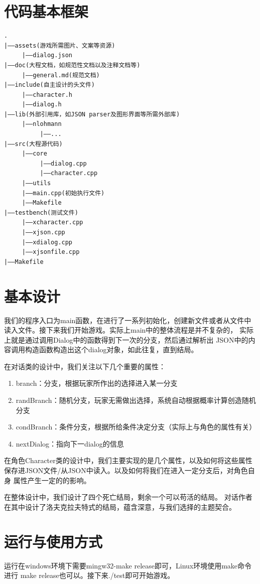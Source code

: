 \documentclass[UTF8]{ctexart}
\begin{document}
    \section{代码基本框架}
\begin{lstlisting}
.
|——assets(游戏所需图片、文案等资源)
     |——dialog.json
|——doc(大程文档，如规范性文档以及注释文档等)
     |——general.md(规范文档)
|——include(自主设计的头文件)
     |——character.h
     |——dialog.h
|——lib(外部引用库，如JSON parser及图形界面等所需外部库)
     |——nlohmann
          |——...
|——src(大程源代码)
     |——core
          |——dialog.cpp
          |——character.cpp
     |——utils
     |——main.cpp(初始执行文件)
     |——Makefile
|——testbench(测试文件)
     |——xcharacter.cpp
     |——xjson.cpp
     |——xdialog.cpp
     |——xjsonfile.cpp
|——Makefile
\end{lstlisting}
    
    \section{基本设计}
    我们的程序入口为main函数，在进行了一系列初始化，创建新文件或者从文件中
    读入文件。接下来我们开始游戏。实际上main中的整体流程是并不复杂的，
    实际上就是通过调用Dialog中的函数得到下一次的分支，然后通过解析出
    JSON中的内容调用构造函数构造出这个dialog对象，如此往复，直到结局。

    在对话类的设计中，我们关注以下几个重要的属性：
    \begin{enumerate}
        \item branch：分支，根据玩家所作出的选择进入某一分支
        \item randBranch：随机分支，玩家无需做出选择，系统自动根据概率计算创造随机分支
        \item condBranch：条件分支，根据所给条件决定分支（实际上与角色的属性有关）
        \item nextDialog：指向下一dialog的信息
    \end{enumerate}
    
    在角色Character类的设计中，我们主要实现的是几个属性，以及如何将这些属性
    保存进JSON文件/从JSON中读入。以及如何将我们在进入一定分支后，对角色自身
    属性产生一定的的影响。

    在整体设计中，我们设计了四个死亡结局，剩余一个可以苟活的结局。
    对话作者在其中设计了洛夫克拉夫特式的结局，蕴含深意，与我们选择的主题契合。

    \section{运行与使用方式}
    运行在windows环境下需要mingw32-make release即可，Linux环境使用make命令进行
    make release也可以。接下来./test即可开始游戏。
\end{document}
